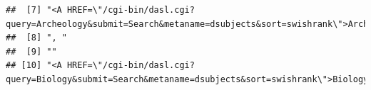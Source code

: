 \documentclass{beamer}\usepackage[]{graphicx}\usepackage[]{color}
\makeatletter
\newenvironment{kframe}{%
 \def\at@end@of@kframe{}%
 \ifinner\ifhmode%
  \def\at@end@of@kframe{\end{minipage}}%
  \begin{minipage}{\columnwidth}%
 \fi\fi%
 \def\FrameCommand##1{\hskip\@totalleftmargin \hskip-\fboxsep
 \colorbox{shadecolor}{##1}\hskip-\fboxsep
     \hskip-\linewidth \hskip-\@totalleftmargin \hskip\columnwidth}%
 \MakeFramed {\advance\hsize-\width
   \@totalleftmargin\z@ \linewidth\hsize
   \@setminipage}}%
 {\par\unskip\endMakeFramed%
 \at@end@of@kframe}
\newenvironment{knitrout}{}{} %
\makeatother
\begin{document}
\begin{frame}[fragile]
\begin{knitrout}
\begin{kframe}
\begin{verbatim}
##  [7] "<A HREF=\"/cgi-bin/dasl.cgi?query=Archeology&submit=Search&metaname=dsubjects&sort=swishrank\">Archeology</A>"                                                                                                                                                                                                                                                                                                                                                                                                                                                                                                                                                                                                                 
##  [8] ", "                                                                                                                                                                                                                                                                                                                                                                                                                                                                                                                                                                                                                                                                                                                            
##  [9] ""                                                                                                                                                                                                                                                                                                                                                                                                                                                                                                                                                                                                                                                                                                                              
## [10] "<A HREF=\"/cgi-bin/dasl.cgi?query=Biology&submit=Search&metaname=dsubjects&sort=swishrank\">Biology</A>"
\end{verbatim}
\end{kframe}
\end{knitrout}

\end{frame}

\end{document}
